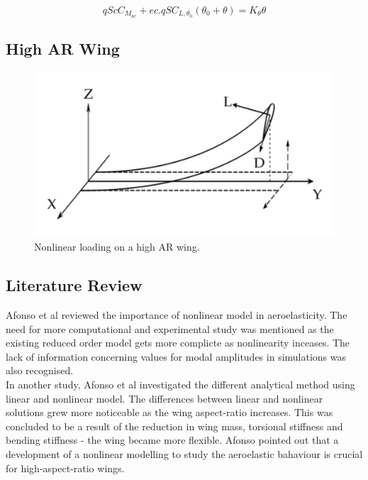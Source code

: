 \documentclass[11pt]{article}
\begin{document}

\begin{equation}
qScC_{M_{ac}} + ec. qSC_{L,{\theta _0}}(\theta _0 + \theta) = K_{\theta}\theta
\end{equation}

\subsection{High AR Wing}

\begin{figure}[H]
    \centering
    \includegraphics[width = .55\textwidth]{figures/Eaton-highly-flexible-wing.png}
    \caption{Nonlinear loading on a high AR wing.}
    \label{fig:high-AR-load}
\end{figure}


\subsection{Literature Review}
Afonso et al\cite{Afonso2017AWings} reviewed the importance of nonlinear model in aeroelasticity. The need for more computational and experimental study was mentioned as the existing reduced order model gets more complicte as nonlinearity inceases. The lack of information concerning values for modal amplitudes in simulations was also recognised.\\

In another study, Afonso et al \cite{Afonso2015LINEARWINGS} investigated the different analytical method using linear and nonlinear model. The differences between linear and nonlinear solutions grew more noticeable as the wing aspect-ratio increases. This was concluded to be a result of the reduction in wing mass, torsional stiffness and bending stiffness - the wing became more flexible. Afonso pointed out that a development of a nonlinear modelling to study the aeroelastic bahaviour is crucial for high-aspect-ratio wings.\\
\end{document}
